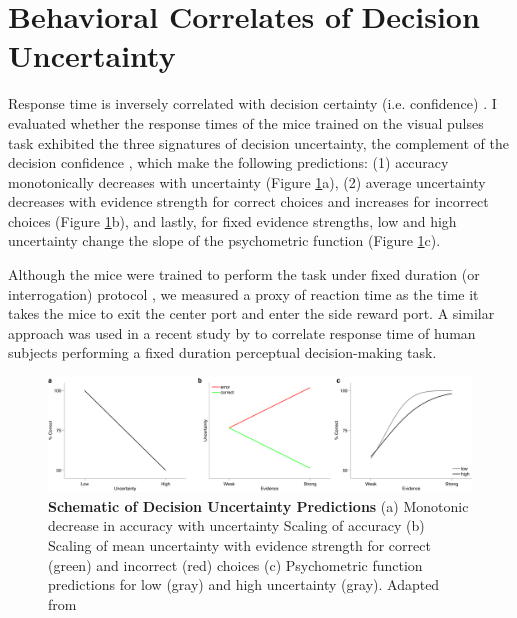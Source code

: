 \section{Behavioral Correlates of Decision Uncertainty}
Response time is inversely correlated with decision certainty (i.e. confidence) \parencite{Kiani2014,Sanders2016,Urai2017}. I evaluated whether the response times of the mice trained on the visual pulses task exhibited the three signatures of decision uncertainty, the complement of the decision confidence \parencite{Kepecs2008,Sanders2016,Urai2017}, which make the following predictions: (1) accuracy monotonically decreases with uncertainty (Figure \ref{fig:uncertainty}a), (2) average uncertainty decreases with evidence strength for correct choices and increases for incorrect choices (Figure \ref{fig:uncertainty}b), and lastly, for fixed evidence strengths, low and high uncertainty change the slope of the psychometric function (Figure \ref{fig:uncertainty}c). \par 
Although the mice were trained to perform the task under fixed duration (or interrogation) protocol \parencite{Bogacz2006}, we measured a proxy of reaction time as the time it takes the mice to exit the center port and enter the side reward port. A similar approach was used in a recent study by \textcite{Urai2017} to correlate response time of human subjects performing a fixed duration perceptual decision-making task.\par 
\begin{figure}
  \centering
  	\includegraphics[width=\textwidth]{Figures/chapter2/schematic_uncertainty_predictions.png}
  \caption[Schematic of Signatures of Decision Uncertainty Predictions]{\textbf{Schematic of Decision Uncertainty Predictions} (a) Monotonic decrease in accuracy with uncertainty Scaling of accuracy (b) Scaling of mean uncertainty with evidence strength for correct (green) and incorrect (red) choices (c) Psychometric function predictions for low (gray) and high uncertainty (gray). Adapted from \textcite{Urai2017,Sanders2016}}
   \label{fig:uncertainty}
\end{figure}
